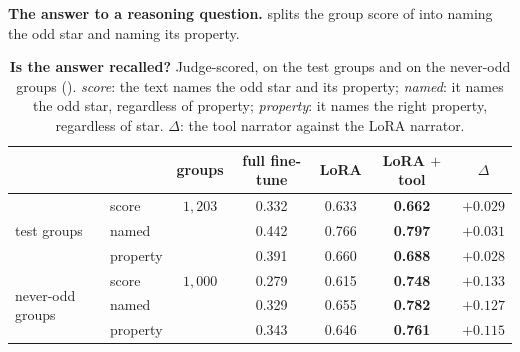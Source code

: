 \textbf{The answer to a reasoning question.}  splits the group score of
 into naming the odd star and naming its property.

\begin{table}[h]\centering\small
\caption{\textbf{Is the answer recalled?} Judge-scored, on the test groups and on the
never-odd groups (). \emph{score}: the text names the odd star and its
property; \emph{named}: it names the odd star, regardless of property; \emph{property}: it
names the right property, regardless of star. $\Delta$: the tool narrator against the LoRA
narrator.}
\label{tab:adversarial}
\begin{tabular}{llccccc}
\toprule
 & & groups & full fine-tune & LoRA & LoRA $+$ tool & $\Delta$ \\
\midrule
\multirow{3}{*}{test groups}
 & score    & $1{,}203$ & 0.332 & 0.633 & \textbf{0.662} & $+0.029$ \\
 & named    &           & 0.442 & 0.766 & \textbf{0.797} & $+0.031$ \\
 & property &           & 0.391 & 0.660 & \textbf{0.688} & $+0.028$ \\
\midrule
\multirow{3}{*}{never-odd groups}
 & score    & $1{,}000$ & 0.279 & 0.615 & \textbf{0.748} & $+0.133$ \\
 & named    &           & 0.329 & 0.655 & \textbf{0.782} & $+0.127$ \\
 & property &           & 0.343 & 0.646 & \textbf{0.761} & $+0.115$ \\
\bottomrule
\end{tabular}
\end{table}

